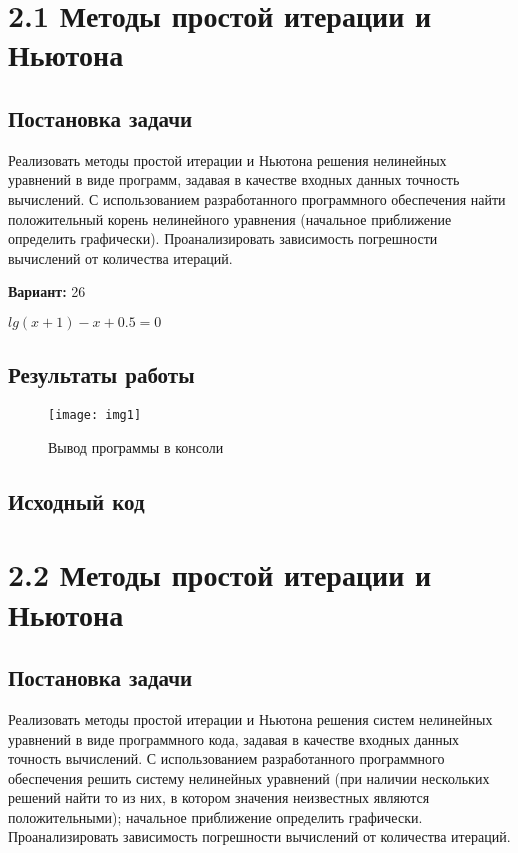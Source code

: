 \section* {2.1  Методы простой итерации и Ньютона}

\subsection{Постановка задачи}
Реализовать методы простой итерации и Ньютона решения нелинейных уравнений в виде программ, задавая в качестве входных данных точность вычислений. С использованием разработанного программного обеспечения найти положительный корень нелинейного уравнения (начальное приближение определить графически). Проанализировать зависимость погрешности вычислений от количества итераций.

{\bfseries Вариант:} 26

$lg(x+1)-x+0.5=0$

\subsection{Результаты работы}
\begin{figure}[h!]
\centering
\texttt{[image: img1]}
\caption{Вывод программы в консоли}
\end{figure}
\pagebreak

\subsection{Исходный код}


\pagebreak

\section* {2.2  Методы простой итерации и Ньютона}

\subsection{Постановка задачи}
Реализовать методы простой итерации и Ньютона решения систем нелинейных уравнений в виде программного кода, задавая в качестве входных данных точность вычислений. С использованием разработанного программного обеспечения решить систему нелинейных уравнений (при наличии нескольких решений найти то из них, в котором значения неизвестных являются положительными); начальное приближение определить графически. Проанализировать зависимость погрешности вычислений от количества итераций. 

